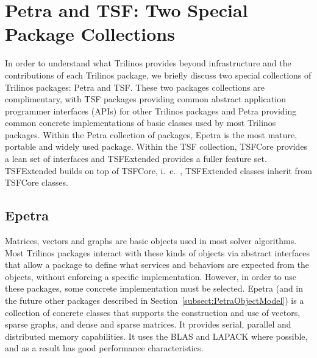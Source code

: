 \documentclass[acmtoms,acmnow]{acmtrans2m}
\begin{document}
\section{Petra and TSF: Two Special Package Collections}
\label{sect:PetraAndTSF}
In order to understand what Trilinos provides beyond infrastructure and the
contributions of each Trilinos package, we briefly discuss two special
collections of
Trilinos packages: Petra and TSF.  These two packages collections are
complimentary, with TSF packages providing common abstract application
programmer interfaces (APIs) for other Trilinos packages and Petra
providing common concrete implementations of basic classes used by most
Trilinos packages.  Within the Petra collection of packages, Epetra is
the most mature, portable and widely used package.  Within the TSF
collection, TSFCore provides a lean set of interfaces and TSFExtended
provides a fuller feature set.  TSFExtended builds on top of TSFCore,
i.~e.~, TSFExtended classes inherit from TSFCore classes.

\subsection{Epetra}
Matrices, vectors and graphs are basic objects used in most solver
algorithms. Most Trilinos
packages interact with these kinds of objects via abstract interfaces that
allow a package to define what services and behaviors are expected from 
the objects,
without enforcing a specific implementation.  However, in order to use
these packages, some concrete
implementation must be selected.  Epetra (and in the future other 
packages described
in Section~\ref{subsect:PetraObjectModel}) is a collection of concrete
classes that supports the construction and use of vectors, sparse
graphs, and dense and sparse matrices.  It provides serial, parallel and
 distributed memory
capabilities.  It uses the BLAS and LAPACK where possible, and as a
result has good performance characteristics.
\end{document}
